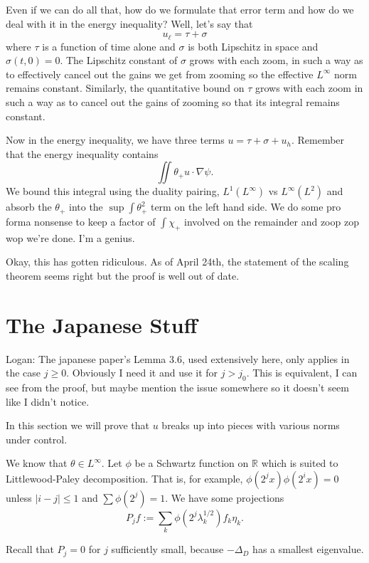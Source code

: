\documentclass[11pt]{amsart}
\theoremstyle{remark}
\newcommand{\R}{\mathbb{R}}
\newcommand{\grad}{\nabla}
\newcommand{\Laplace}{\Delta}
\newcommand{\eigen}[1]{\eta_{#1}} %
\begin{document}
Even if we can do all that, how do we formulate that error term and how do we deal with it in the energy inequality?  Well, let's say that
\[ u_\ell = \tau + \sigma \]
where $\tau$ is a function of time alone and $\sigma$ is both Lipschitz in space and $\sigma(t,0) = 0$.  The Lipschitz constant of $\sigma$ grows with each zoom, in such a way as to effectively cancel out the gains we get from zooming so the effective $L^\infty$ norm remains constant.  Similarly, the quantitative bound on $\tau$ grows with each zoom in such a way as to cancel out the gains of zooming so that its integral remains constant.  

Now in the energy inequality, we have three terms $u = \tau + \sigma + u_h$.  Remember that the energy inequality contains
\[ \iint \theta_+ u \cdot \grad \psi. \]
We bound this integral using the duality pairing, $L^1(L^\infty)$ vs $L^\infty(L^2)$ and absorb the $\theta_+$ into the $\sup \int \theta_+^2$ term on the left hand side.  We do some pro forma nonsense to keep a factor of $\int \chi_+$ involved on the remainder and zoop zop wop we're done.  I'm a genius.  

Okay, this has gotten ridiculous.  As of April 24th, the statement of the scaling theorem seems right but the proof is well out of date.  



\section{The Japanese Stuff}

Logan: The japanese paper's Lemma 3.6, used extensively here, only applies in the case $j \geq 0$. Obviously I need it and use it for $j > j_0$.  This is equivalent, I can see from the proof, but maybe mention the issue somewhere so it doesn't seem like I didn't notice.  

In this section we will prove that $u$ breaks up into pieces with various norms under control.  

We know that $\theta \in L^\infty$.  Let $\phi$ be a Schwartz function on $\R$ which is suited to Littlewood-Paley decomposition.  That is, for example, $\phi(2^j x) \phi(2^i x) = 0$ unless $|i-j|\leq 1$ and $\sum \phi(2^j) = 1$.  We have some projections 
\[ P_j f := \sum_k \phi(2^j \lambda_k^{1/2}) f_k \eigen{k}. \]

Recall that $P_j = 0$ for $j$ sufficiently small, because $-\Laplace_D$ has a smallest eigenvalue.  
\end{document}
